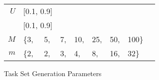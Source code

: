 \begin{wrapfigure}{r}{.475\linewidth}
  \centering
  \begin{tabular}{r|llllllll}
    ${U}$ & \multicolumn{2}{l}{[0.1, 0.9]} \\
    \GFactor{} & \multicolumn{2}{l}{[0.1, 0.9]} \\
    \hline
    ${M}$ & \{3, & 5, & 7, & 10, & 25, & 50, & 100\} \\
    ${m}$ & \{2, & 2, & 3, & 4, & 8, & 16, & 32\}
  \end{tabular}
  \caption{Task Set Generation Parameters }
  \label{fig:gen-params}
\end{wrapfigure}
